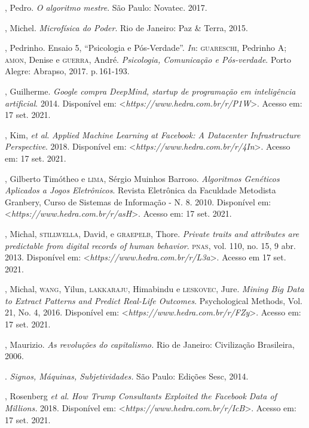 \begin{bibliohedra}
, Pedro. \emph{O algoritmo mestre}. São Paulo: Novatec. 2017.

, Michel. \emph{Microfísica do Poder}. Rio de Janeiro: Paz \&
Terra, 2015.

, Pedrinho. Ensaio 5, ``Psicologia e Pós-Verdade''. \emph{In}:
\textsc{guareschi}, Pedrinho A; \textsc{amon}, Denise e \textsc{guerra}, André. \emph{Psicologia,
Comunicação e Pós-verdade}. Porto Alegre: Abrapso, 2017. p.\,161-193.

, Guilherme. \emph{Google compra DeepMind, startup de programação
em inteligência artificial}. 2014. Disponível em: \textless{}\emph{https://www.hedra.com.br/r/P1W}\textgreater{}. Acesso em: 17 set. 2021.

, Kim, \emph{et al}. \emph{Applied Machine Learning at Facebook: A
Datacenter Infrastructure Perspective}. 2018. Disponível em: \textless{}\emph{https://www.hedra.com.br/r/4In}\textgreater{}. Acesso em: 17 set. 2021.

, Gilberto Timótheo e \textsc{lima}, Sérgio Muinhos Barroso.
\emph{Algoritmos Genéticos Aplicados a Jogos Eletrônicos}. Revista
Eletrônica da Faculdade Metodista Granbery, Curso de Sistemas de
Informação - N. 8. 2010. Disponível em: \textless{}\emph{https://www.hedra.com.br/r/asH}\textgreater{}. Acesso em: 17 set. 2021.

, Michal, \textsc{stillwella}, David, e \textsc{graepelb}, Thore.
\emph{Private traits and attributes are predictable from digital
records of human behavior}. \textsc{pnas}, vol. 110, no. 15, 9 abr. 2013.
Disponível em: \textless{}\emph{https://www.hedra.com.br/r/L3a}\textgreater{}. Acesso em 17 set. 2021.

, Michal, \textsc{wang}, Yilun, \textsc{lakkaraju}, Himabindu e \textsc{leskovec}, Jure. \emph{Mining Big Data to Extract Patterns and Predict Real-Life
Outcomes}. Psychological Methods, Vol. 21, No. 4, 2016. Disponível em:
\textless{}\emph{https://www.hedra.com.br/r/FZy}\textgreater{}. Acesso em: 17 set. 2021.

, Maurizio. \emph{As revoluções do capitalismo.} Rio de
Janeiro: Civilização Brasileira, 2006.

\titidem. \emph{Signos, Máquinas, Subjetividades.} São
Paulo: Edições Sesc, 2014.

, Rosenberg \emph{et al}. \emph{How Trump Consultants Exploited the
Facebook Data of Millions.} 2018. Disponível em: \textless{}\emph{https://www.hedra.com.br/r/IcB}\textgreater{}. Acesso em: 17 set. 2021.


\end{bibliohedra}
